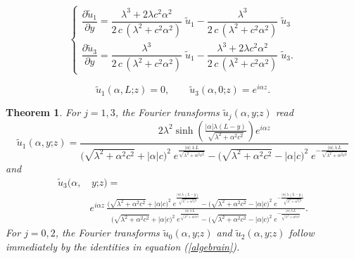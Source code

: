 \documentclass[10pt,a4paper]{amsart}
\newtheorem{thm}{Theorem}
\renewcommand{\sinh}{\operatorname{sinh}}
\begin{document}
\begin{equation}\label{bivFouriersys2}
\begin{cases}
\dfrac{\partial \widetilde{u}_1}{\partial y}=\dfrac{\lambda^3+2\lambda c^2\alpha^2}{2\,c\,(\lambda^2+c^2\alpha^2)}\;\widetilde{u}_1-\dfrac{\lambda^3}{2\,c\,(\lambda^2+c^2\alpha^2)}\;\widetilde{u}_3\\[0.85em]
\dfrac{\partial \widetilde{u}_3}{\partial y}=\dfrac{\lambda^3}{2\,c\,(\lambda^2+c^2\alpha^2)}\;\widetilde{u}_1-\dfrac{\lambda^3+2\lambda c^2\alpha^2}{2\,c\,(\lambda^2+c^2\alpha^2)}\;\widetilde{u}_3.
\end{cases}
\end{equation}

\begin{equation}\label{stripboundarycon}\widetilde{u}_1(\alpha,L\mathord{;}z)=0,\qquad \widetilde{u}_3(\alpha,0\mathord{;}z)=e^{i\alpha z}.\end{equation}

\begin{thm}\label{tildeuthm}
For $j=1,3$, the Fourier transforms $\widetilde{u}_j(\alpha,y\mathord{;}z)$ read
\begin{equation}\label{uhat1solu}\widetilde{u}_1(\alpha,y\mathord{;}z)=\frac{2\lambda^2\sinh\left(\frac{\lvert\alpha\lvert\lambda(L-y)}{\sqrt{\lambda^2+\alpha^2c^2}}\right)e^{i\alpha z}}{\big(\sqrt{\lambda^2+\alpha^2c^2}+\lvert\alpha\lvert c\big)^2\;e^{\frac{\lvert\alpha\lvert\,\lambda\,L}{\sqrt{\lambda^2+\alpha^2c^2}}}-\big(\sqrt{\lambda^2+\alpha^2c^2}-\lvert\alpha\lvert c\big)^2\;e^{-\frac{\lvert\alpha\lvert\,\lambda\,L}{\sqrt{\lambda^2+\alpha^2c^2}}}}\end{equation}
and
\begin{align}\widetilde{u}_3(\alpha,&\,y\mathord{;}z)=\nonumber\\
&e^{i\alpha z}\,\frac{\big(\sqrt{\lambda^2+\alpha^2c^2}+\lvert\alpha\lvert c\big)^2\;e^{\frac{\lvert\alpha\lvert\,\lambda\,(L-y)}{\sqrt{\lambda^2+\alpha^2c^2}}}-\big(\sqrt{\lambda^2+\alpha^2c^2}-\lvert\alpha\lvert c\big)^2\;e^{-\frac{\lvert\alpha\lvert\,\lambda\,(L-y)}{\sqrt{\lambda^2+\alpha^2c^2}}}}{\big(\sqrt{\lambda^2+\alpha^2c^2}+\lvert\alpha\lvert c\big)^2\;e^{\frac{\lvert\alpha\lvert\,\lambda\,L}{\sqrt{\lambda^2+\alpha^2c^2}}}-\big(\sqrt{\lambda^2+\alpha^2c^2}-\lvert\alpha\lvert c\big)^2\;e^{-\frac{\lvert\alpha\lvert\,\lambda\,L}{\sqrt{\lambda^2+\alpha^2c^2}}}}.\label{uhat3solu}\end{align}
For $j=0,2$, the Fourier transforms $\widetilde{u}_0(\alpha,y\mathord{;}z)$ and $\widetilde{u}_2(\alpha,y\mathord{;}z)$ follow immediately by the identities in equation (\ref{algebrain}).\end{thm}
\end{document}
